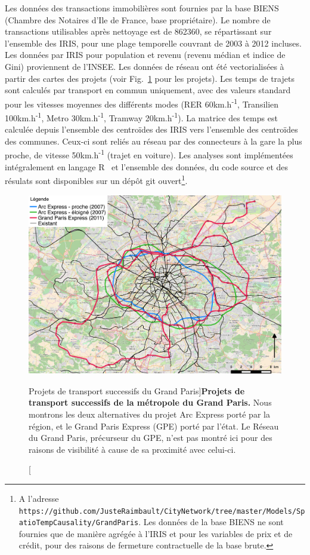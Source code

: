 Les données des transactions immobilières sont fournies par la base BIENS (Chambre des Notaires d'Ile de France, base propriétaire). Le nombre de transactions utilisables après nettoyage est de 862360, se répartissant sur l'ensemble des IRIS, pour une plage temporelle couvrant de 2003 à 2012 incluses. Les données par IRIS pour population et revenu (revenu médian et indice de Gini) proviennent de l'INSEE. Les données de réseau ont été vectorialisées à partir des cartes des projets (voir Fig.~\ref{fig:projects} pour les projets). Les temps de trajets sont calculés par transport en commun uniquement, avec des valeurs standard pour les vitesses moyennes des différents modes (RER 60km.h\textsuperscript{-1}, Transilien 100km.h\textsuperscript{-1}, Metro 30km.h\textsuperscript{-1}, Tramway 20km.h\textsuperscript{-1}). La matrice des temps est calculée depuis l'ensemble des centroïdes des IRIS vers l'ensemble des centroïdes des communes. Ceux-ci sont reliés au réseau par des connecteurs à la gare la plus proche, de vitesse 50km.h\textsuperscript{-1} (trajet en voiture). Les analyses sont implémentées intégralement en langage R~\cite{rcoreteam} et l'ensemble des données, du code source et des résulats sont disponibles sur un dépôt git ouvert\footnote{A l'adresse\\\texttt{https://github.com/JusteRaimbault/CityNetwork/tree/master/Models/SpatioTempCausality/GrandParis}. Les données de la base BIENS ne sont fournies que de manière agrégée à l'IRIS et pour les variables de prix et de crédit, pour des raisons de fermeture contractuelle de la base brute.}.




\begin{figure}[h!]
\includegraphics[width=\linewidth]{Figures/GrandParisRealEstate/reseaux}
\caption[][Projets de transport successifs du Grand Paris]{\label{fig:projects}}{\textbf{Projets de transport successifs de la métropole du Grand Paris.} Nous montrons les deux alternatives du projet Arc Express porté par la région, et le Grand Paris Express (GPE) porté par l'état. Le Réseau du Grand Paris, précurseur du GPE, n'est pas montré ici pour des raisons de visibilité à cause de sa proximité avec celui-ci.\label{fig:projects}}
\end{figure}



